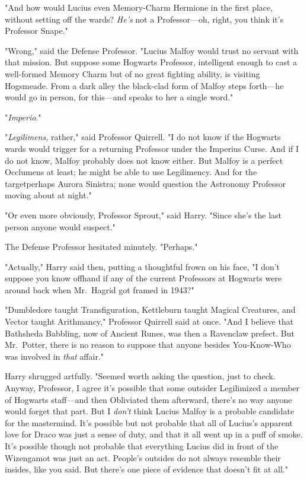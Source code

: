 "And how would Lucius even Memory-Charm Hermione in the first place, without
setting off the wards? \emph{He's} not a Professor—oh, right, you think it's
Professor Snape."

"Wrong," said the Defense Professor. "Lucius Malfoy would trust no servant with
that mission. But suppose some Hogwarts Professor, intelligent enough to cast a
well-formed Memory Charm but of no great fighting ability, is visiting
Hogsmeade. From a dark alley the black-clad form of Malfoy steps forth—he
would go in person, for this—and speaks to her a single word."

"\emph{Imperio}."

"\emph{Legilimens,} rather," said Professor Quirrell. "I do not know if the
Hogwarts wards would trigger for a returning Professor under the Imperius
Curse. And if I do not know, Malfoy probably does not know either. But Malfoy
is a perfect Occlumens at least; he might be able to use Legilimency. And for
the target{\el}perhaps Aurora Sinistra; none would question the Astronomy
Professor moving about at night."

"Or even more obviously, Professor Sprout," said Harry. "Since she's the last
person anyone would suspect."

The Defense Professor hesitated minutely. "Perhaps."

"Actually," Harry said then, putting a thoughtful frown on his face, "I don't
suppose you know offhand if any of the current Professors at Hogwarts were
around back when Mr.~Hagrid got framed in 1943?"

"Dumbledore taught Transfiguration, Kettleburn taught Magical Creatures, and
Vector taught Arithmancy," Professor Quirrell said at once. "And I believe that
Bathsheda Babbling, now of Ancient Runes, was then a Ravenclaw prefect. But
Mr.~Potter, there is no reason to suppose that anyone besides You-Know-Who was
involved in \emph{that} affair."

Harry shrugged artfully. "Seemed worth asking the question, just to check.
Anyway, Professor, I agree it's possible that some outsider Legilimized a
member of Hogwarts staff—and then Obliviated them afterward, there's no way
anyone would forget that part. But I \emph{don't} think Lucius Malfoy is a
probable candidate for the mastermind. It's possible but not probable that all
of Lucius's apparent love for Draco was just a sense of duty, and that it all
went up in a puff of smoke. It's possible though not probable that everything
Lucius did in front of the Wizengamot was just an act. People's outsides do not
always resemble their insides, like you said. But there's one piece of evidence
that doesn't fit at all."

